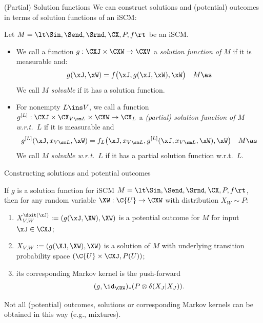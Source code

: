 \begin{frame}{(Partial) Solution functions}
We can construct solutions and (potential) outcomes in terms of solution functions of an iSCM:
  \begin{Def}[\ref{def:scm_solution_functions},\ref{def:scm_partial_solution_functions}]
    Let $M = \lt \Sin, \Send, \Srnd, \CX, P, f \rt$ be an iSCM.

    \begin{itemize}
      \item We call a function $g : \CXJ \times \CXW \to \CXV$ a \emph{solution function of $M$} if it is measurable and:
    $$g(\xJ,\xW) = f\big(\xJ, g(\xJ,\xW), \xW\big) \quad M\as$$
    We call $M$ \emph{solvable} if it has a solution function.
  \item For nonempty $L \ins V$,  we call a function $g^{[L]} : \CXJ \times \CX_{V\sm L} \times \CXW \to \CX_L$ a \emph{(partial) solution function of $M$ w.r.t.\ $L$} if it is measurable and
    $$g^{[L]}(\xJ,x_{V\sm L},\xW) = f_L\big(\xJ, x_{V\sm L}, g^{[L]}(\xJ,x_{V\sm L},\xW), \xW\big) \quad M\as$$
    We call $M$ \emph{solvable w.r.t.\ $L$} if it has a partial solution function w.r.t.\ $L$.
    \end{itemize}
  \end{Def}
\end{frame}

\begin{frame}{Constructing solutions and potential outcomes}
  \begin{Prp}[\ref{prp:using_solution_functions}]
  If $g$ is a solution function for iSCM $M = \lt \Sin, \Send, \Srnd, \CX, P, f \rt$, then for any random variable $\XW : \C{U} \to \CXW$ with distribution $X_W \sim P$:
  \begin{enumerate}
    \item
      $X_{V,W}^{\doit(\xJ)} := (g(\xJ, \XW),\XW)$ is a potential outcome for $M$ for input $\xJ\in\CXJ$;
    \item
      $X_{V,W} := (g(\XJ, \XW),\XW)$ is a solution of $M$
      with underlying transition probability space $(\C{U} \times \CXJ, P(U))$;
    \item its corresponding Markov kernel is the push-forward
      $$(g,\id_{\CXW})_* (P \otimes \delta(X_J|X_J)).$$
  \end{enumerate}
\end{Prp}
Not all (potential) outcomes, solutions or corresponding Markov kernels can be obtained in this way (e.g., mixtures).
\end{frame}

